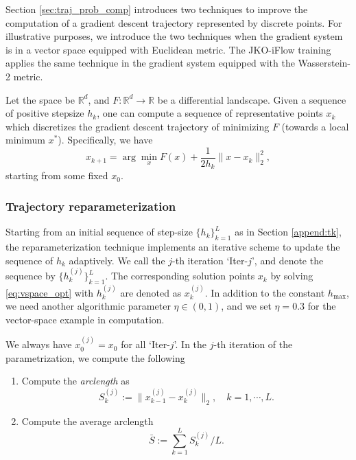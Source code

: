 \documentclass{article}
\theoremstyle{remark}
\theoremstyle{plain}
\newcommand{\xt}[1]{x_{#1}}
\newcommand{\JKO}{JKO-iFlow}
\newcommand{\R}{\mathbb{R}}
\begin{document}
{Section \ref{sec:traj_prob_comp} introduces two techniques to improve the computation of a gradient descent trajectory represented by discrete points. For illustrative purposes, we introduce the two techniques when the gradient system is in a vector space equipped with Euclidean metric. 
The \JKO{} training applies the same technique in the gradient system
equipped with the Wasserstein-2 metric. 


Let the space be $\R^d$, and $F:\R^d \to \R $ be a differential landscape. Given a sequence of positive stepsize $h_k$, 
one can compute a sequence of representative points $x_k$ which discretizes the gradient descent trajectory of minimizing $F$ (towards a local minimum $x^*$). Specifically, we have
\begin{equation}\label{eq:vspace_opt}
    \xt{k+1} = \arg\min_x F(x)+\frac{1}{2h_k} \|x-\xt{k}\|_2^2,
\end{equation}
starting from some fixed $x_0$. 




\subsubsection{Trajectory reparameterization}\label{sec:reparam_details}

Starting from an initial sequence of step-size $\{ h_k\}_{k=1}^L$ as in Section \ref{append:tk},
the reparameterization technique implements an iterative scheme to update the sequence of $h_k$ adaptively.
We call the $j$-th iteration `Iter-$j$', and denote the sequence by $\{ h_k^{(j)}\}_{k=1}^L$. 
The corresponding solution points $x_k$ by solving \eqref{eq:vspace_opt} with $ h_k^{(j)}$ are denoted as $x_k^{(j)}$.
In addition to the constant $h_{\max}$, we need another algorithmic parameter $\eta \in (0,1)$, and we set $\eta = 0.3$ for the vector-space example in computation. 


We always have $\xt{0}^{(j)} = x_0$  for all `Iter-$j$'.
In the $j$-th iteration of the parametrization, we compute the following
\begin{enumerate}
    \item Compute the {\it arclength} as 
    \begin{equation}\label{eq:def-Skj-arclength}
        S_k^{(j)}:=\|\xt{k-1}^{(j)}-\xt{k}^{(j)}\|_2,
        \quad k = 1, \cdots, L.
    \end{equation}


   \item  
    Compute the average arclength 
    \[\bar{S}:=\sum_{k=1}^{L} S_k^{(j)}/L.
    \]
    

\end{enumerate}}
\end{document}
